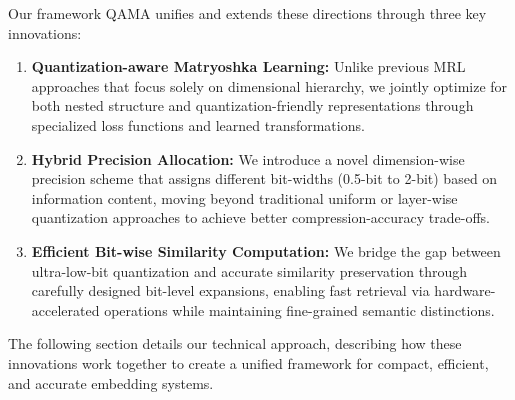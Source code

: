 Our framework QAMA unifies and extends these directions through three key innovations:
\begin{enumerate}
    \item \textbf{Quantization-aware Matryoshka Learning:} Unlike previous MRL approaches that focus solely on dimensional hierarchy, we jointly optimize for both nested structure and quantization-friendly representations through specialized loss functions and learned transformations.
    
    \item \textbf{Hybrid Precision Allocation:} We introduce a novel dimension-wise precision scheme that assigns different bit-widths (0.5-bit to 2-bit) based on information content, moving beyond traditional uniform or layer-wise quantization approaches to achieve better compression-accuracy trade-offs.
    
    \item \textbf{Efficient Bit-wise Similarity Computation:} We bridge the gap between ultra-low-bit quantization and accurate similarity preservation through carefully designed bit-level expansions, enabling fast retrieval via hardware-accelerated operations while maintaining fine-grained semantic distinctions.
\end{enumerate}

The following section details our technical approach, describing how these innovations work together to create a unified framework for compact, efficient, and accurate embedding systems.

